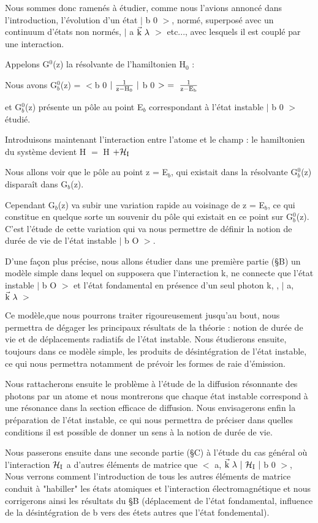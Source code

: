 Nous sommes donc ramenés à étudier, comme nous l'avions annoncé
dans l'introduction, l'évolution d'un état $|$ b 0 $>$, normé, superposé avec un
continuum d'états non normés, $|$ a $\vec{\text{k}}\ \lambda$ $>$ etc..., avec lesquels il est couplé
par une interaction.

Appelons G$^0$(z) la résolvante de l’hamiltonien H$_0$ :

Nous avons G$^0_b$(z) = $<$b 0 $|\ \frac{1}{\text{z}-\text{H}_0}\ |$ b 0 $>\ =\ \frac{1}{\mt{z}-\mt{E}_\mt{b}}$

et G$^0_b$(z) présente un pôle au point E$_b$ correspondant à l'état instable
$|$ b 0 $>$ étudié.

Introduisons maintenant l'interaction entre l'atome et le champ :
le hamiltonien du système devient H $=$ H $+\mathcal{H}_{\text{I}}$

Nous allons voir que le pôle au point z = E$_b$, qui existait dans
la résolvante G$^0_b$(z) disparaît dans G$_b$(z).

Cependant G$_b$(z) va subir une variation rapide au voisinage de
z = E$_b$, ce qui constitue en quelque sorte un souvenir du pôle qui existait
en ce point sur G$^0_b$(z). C'est l'étude de cette variation qui va nous permettre de définir la notion de durée de vie de l'état instable $|$ b O $>$.

D'une façon plus précise, nous allons étudier dans une première
partie (\S B) un modèle simple dans lequel on supposera que l'interaction k,
ne connecte que l'état instable $|$ b O $>$ et l'état fondamental en présence
d'un seul photon k, , $|$ a, $\vec{\text{k}}\ \lambda\ >$

Ce modèle,que nous pourrons traiter rigoureusement jusqu'au bout,
nous permettra de dégager les principaux résultats de la théorie : notion de
durée de vie et de déplacements radiatifs de l’état instable. Nous étudierons
ensuite, toujours dans ce modèle simple, les produits de désintégration de
l'état instable, ce qui nous permettra notamment de prévoir les formes de raie
d'émission.

Nous rattacherons ensuite le problème à l'étude de la diffusion
résonnante des photons par un atome et nous montrerons que chaque état instable
correspond à une résonance dans la section efficace de diffusion. Nous envisagerons enfin la préparation de l'état instable, ce qui nous permettra de préciser
dans quelles conditions il est possible de donner un sens à la notion de durée
de vie.

Nous passerons ensuite dans une seconde partie (\S C) à l'étude
du cas général où l'interaction $\mathcal{H}_{\text{I}}$ a d'autres éléments de matrice que
$<$ a, $\vec{\mt{k}}\ \lambda\ |\ \mc{H}_\mt{I}\ |$ b 0 $>$, Nous verrons comment l'introduction de tous les autres éléments de matrice conduit à "habiller" les états atomiques et l'interaction
électromagnétique et nous corrigerons ainsi les résultats du \S B (déplacement
de l'état fondamental, influence de la désintégration de b vers des étets
autres que l'état fondemental).

